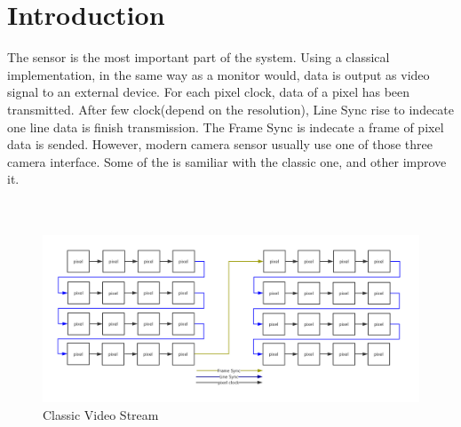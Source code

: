 \documentclass[12pt,article]{memoir}
\begin{document}
\section{Introduction}
The sensor is the most important part of the system. Using a classical implementation, in the same way as a monitor would, data is output as video signal to an external device. For each pixel clock, data of a pixel has been transmitted. After few clock(depend on the resolution), Line Sync rise to indecate one line data is finish transmission. The Frame Sync is indecate a frame of pixel data is sended. However, modern camera sensor usually use one of those three camera interface. Some of the is samiliar with the classic one, and other improve it.\\\\\
\begin{figure}[htp]
\includegraphics[width=\textwidth]{img/DR00002_Cam.png}
 \caption{Classic Video Stream}	
\end{figure}
\newpage
\end{document}
